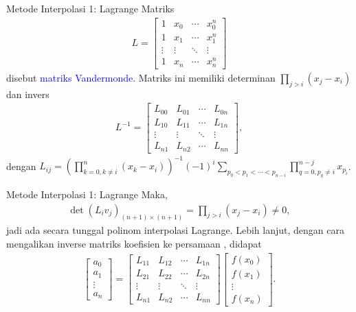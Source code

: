 \documentclass[xcolor={dvipsnames}, 9pt]{beamer}
\renewcommand{\emph}[1]{\textcolor{Blue}{#1}}
\begin{document}
    \begin{frame}{Metode Interpolasi 1: Lagrange}
        Matriks
        \begin{align*}
            L =
            \begin{bmatrix}
                1 & x_0 & \cdots & x_0^n \\
                1 & x_1 & \cdots & x_1^n \\
                \vdots & \vdots & \ddots & \vdots \\
                1 & x_n & \cdots & x_n^n
            \end{bmatrix}
        \end{align*}
        disebut \emph{matriks Vandermonde}. Matriks ini memiliki determinan $\prod_{j>i}(x_j-x_i)$ dan invers
        \begin{align*}
            L^{-1} =  
            \begin{bmatrix}
                L_{00} & L_{01} & \cdots & L_{0n} \\
                L_{10} & L_{11} & \cdots & L_{1n} \\
                \vdots & \vdots & \ddots & \vdots \\
                L_{n1} & L_{n2} & \cdots & L_{nn}
            \end{bmatrix},
        \end{align*}
        dengan $L_{ij} = (\prod_{k=0, k\neq i}^{n}(x_k-x_i))^{-1}(-1)^{i}\sum_{p_0<p_1<\cdots<p_{n-i}}\prod_{q=0,p_q\neq i}^{n-j}x_{p_i}$.
    \end{frame}
    \begin{frame}{Metode Interpolasi 1: Lagrange}
        Maka,
        \begin{align*}
            \det(L_iv_j)_{(n+1)\times(n+1)} = \prod_{j>i}(x_j-x_i)\neq 0,
        \end{align*}
        jadi ada secara tunggal polinom interpolasi Lagrange. Lebih lanjut, dengan cara mengalikan inverse matriks koefisien ke persamaan \theequation, didapat
        \begin{align*}
            \begin{bmatrix}
                a_0 \\ a_1 \\ \vdots \\ a_n
            \end{bmatrix} = 
            \begin{bmatrix}
                L_{11} & L_{12} & \cdots & L_{1n} \\
                L_{21} & L_{22} & \cdots & L_{2n} \\
                \vdots & \vdots & \ddots & \vdots \\
                L_{n1} & L_{n2} & \cdots & L_{nn}
            \end{bmatrix}
            \begin{bmatrix}
                f(x_0) \\ f(x_1) \\ \vdots \\ f(x_n)
            \end{bmatrix}.
        \end{align*}
    \end{frame}
\end{document}
